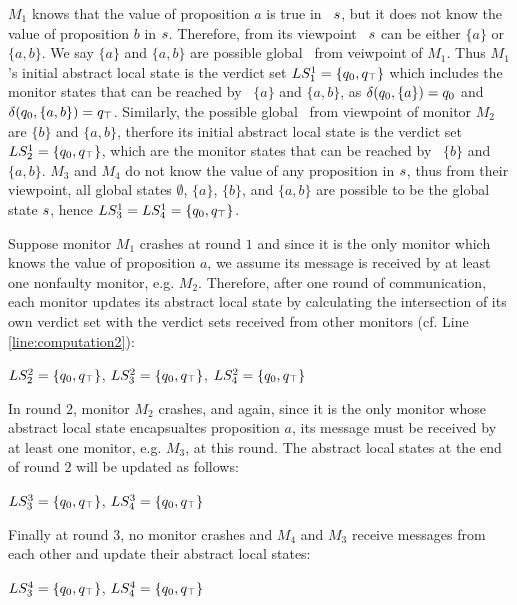 $M_1$ knows that the value of proposition $a$ is true in \event~$s$, but it 
does not know the value of proposition $b$ in $s$. Therefore, from its 
viewpoint \event~$s$ can be either $\{a\}$ or $\{a,b\}$. We say $\{a\}$ and 
$\{a,b\}$ are possible global \events~from veiwpoint of $M_1$. Thus $M_1$'s 
initial abstract local state is the verdict set $LS_1^1=\{q_0, 
q_\top \}$ which includes the monitor states that can be reached by 
\events~$\{a\}$ and $\{a,b\}$, as $\delta(q_0, \{a\})=q_0$ and 
$\delta(q_0, \{a,b\})=q_\top$. Similarly, the possible global 
\events~from viewpoint of monitor $M_2$ are $\{b\}$ and $\{a,b\}$, therfore its 
initial abstract local state is the verdict set $LS_2^1=\{q_0, 
q_\top \}$, which are the monitor states that can be reached by 
\events~$\{b\}$ and $\{a,b\}$. $M_3$ and $M_4$ do not know the value of any 
proposition in $s$, thus from their viewpoint, all global states 
$\emptyset$, $\{a\}$, $\{b\}$, and $\{a,b\}$ are possible to be the global state 
$s$, hence $LS_3^1= LS_4^1=\{q_0, q_\top\}$.

Suppose monitor $M_1$ crashes at round $1$ and since it is the only monitor 
which knows the value of proposition $a$, we assume its message is received by 
at least one nonfaulty monitor, e.g. $M_2$. Therefore, after one round of 
communication, each monitor updates its abstract local state by calculating the 
intersection of its own verdict set with the verdict sets received from other 
monitors (cf. Line \ref{line:computation2}): 

 $LS_2^2 = \{q_0, q_\top\}$,
 $LS_3^2 = \{q_0, q_\top\}$,
 $LS_4^2 = \{q_0, q_\top\}$ 
 
\noindent In round $2$, monitor $M_2$ crashes, and again, since it is the only 
monitor whose abstract local state encapsualtes proposition $a$, its message 
must be received by at least one monitor, e.g. $M_3$, at this round. The 
abstract local states at the end of round $2$ will be updated as follows: 

 $LS_3^3 = \{q_0, q_\top\}$,
 $LS_4^3 = \{q_0, q_\top\}$ 


\noindent Finally at round $3$, no monitor crashes and $M_4$ and $M_3$ receive 
messages from each other and update their abstract local states:

 $LS_3^4 = \{q_0, q_\top\}$,
 $LS_4^4 = \{q_0, q_\top\}$ \\

